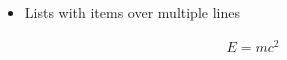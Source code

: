\documentclass{article}
\begin{document}
\begin{itemize}
  \item Lists with items
    over multiple lines
\end{itemize}

\begin{align}
  E = m c^2
\end{align}
\end{document}
